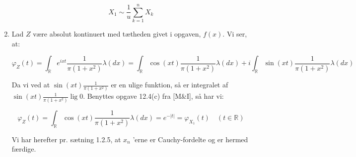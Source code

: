\documentclass{Class}
\newcommand{\1}{\mathbbm{1}}
\theoremstyle{boxed}
\begin{document}
\begin{enumerate}
  $$
  X_1 \sim \frac{1}{u} \sum_{k=1}^n X_k
  $$
  \item Lad $Z$ være absolut kontinuert med tætheden givet i opgaven, $f(x)$. Vi ser, at:

  $$
  \varphi_Z(t)=\int_{\mathbb{R}} e^{i x t} \frac{1}{\pi\left(1+x^2\right)} \lambda(d x)=\int_{\mathbb{R}} \cos (x t) \frac{1}{\pi\left(1+x^2\right)} \lambda(d x)+i \int_{\mathbb{R}} \sin (x t) \frac{1}{\pi\left(1+x^2\right)} \lambda(d x)
  $$
  
  
  Da vi ved at $\sin (x t) \frac{1}{\pi\left(1+x^2\right)}$ er en ulige funktion, så er integralet af $\sin (x t) \frac{1}{\pi\left(1+x^2\right)} \operatorname{lig} 0$. Benyttes opgave 12.4(c) fra [M\&I], så har vi:
  
  $$
  \varphi_Z(t)=\int_{\mathbb{R}} \cos (x t) \frac{1}{\pi\left(1+x^2\right)} \lambda(d x)=e^{-|t|}=\varphi_{X_1}(t) \quad(t \in \mathbb{R})
  $$
  
  
  Vi har herefter pr. sætning 1.2.5, at $x_n$ 'erne er Cauchy-fordelte og er hermed færdige.
\end{enumerate}
\end{document}
